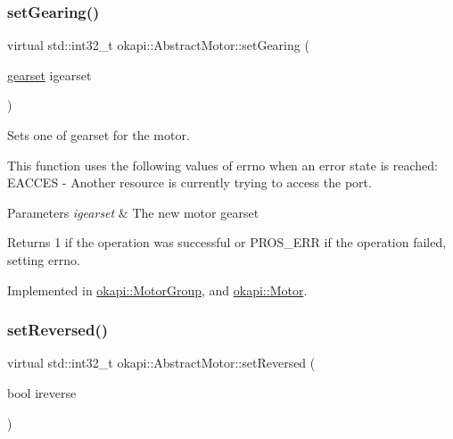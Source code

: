 \subsubsection{\texorpdfstring{setGearing()}{setGearing()}}
{\footnotesize\ttfamily virtual std\+::int32\+\_\+t okapi\+::\+Abstract\+Motor\+::set\+Gearing (\begin{DoxyParamCaption}\item[{\mbox{\hyperlink{classokapi_1_1AbstractMotor_a88aaa6ea2fa10f5520a537bbf26774d5}{gearset}}}]{igearset }\end{DoxyParamCaption})\hspace{0.3cm}{\ttfamily [pure virtual]}}

Sets one of gearset for the motor.

This function uses the following values of errno when an error state is reached\+: E\+A\+C\+C\+ES -\/ Another resource is currently trying to access the port.


\begin{DoxyParams}{Parameters}
{\em igearset} & The new motor gearset \\
\hline
\end{DoxyParams}
\begin{DoxyReturn}{Returns}
1 if the operation was successful or P\+R\+O\+S\+\_\+\+E\+RR if the operation failed, setting errno. 
\end{DoxyReturn}


Implemented in \mbox{\hyperlink{classokapi_1_1MotorGroup_a5720f3775594f0097856754776526a47}{okapi\+::\+Motor\+Group}}, and \mbox{\hyperlink{classokapi_1_1Motor_a670cb230fe9686ce8fa71ee20607eb12}{okapi\+::\+Motor}}.

\mbox{\label{classokapi_1_1AbstractMotor_a72a6a4eb9d237ad57b92401b08ad64fa}} 
\subsubsection{\texorpdfstring{setReversed()}{setReversed()}}
{\footnotesize\ttfamily virtual std\+::int32\+\_\+t okapi\+::\+Abstract\+Motor\+::set\+Reversed (\begin{DoxyParamCaption}\item[{bool}]{ireverse }\end{DoxyParamCaption})\hspace{0.3cm}{\ttfamily [pure virtual]}}

